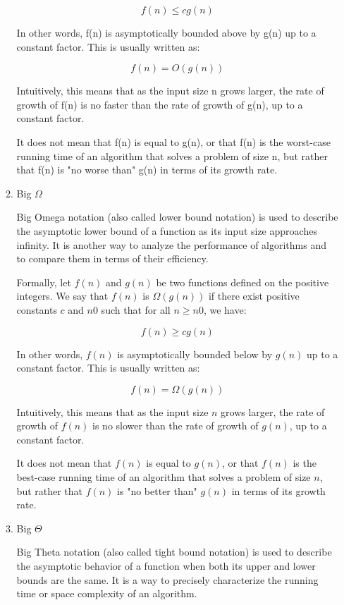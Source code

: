 \documentclass{article}
\begin{document}
\begin{enumerate}
\begin{enumerate}
    $$f(n) \leq c g(n)$$
    
    In other words, f(n) is asymptotically bounded above by g(n) up to a constant factor. This is usually written as:
    
    $$f(n) = O(g(n))$$
    
    Intuitively, this means that as the input size n grows larger, the rate of growth of f(n) is no faster than the rate of growth of g(n), up to a constant factor. 
    
    It does not mean that f(n) is equal to g(n), or that f(n) is the worst-case running time of an algorithm that solves a problem of size n, but rather that f(n) is "no worse than" g(n) in terms of its growth rate.

    \item Big $\Omega$

    Big Omega notation (also called lower bound notation) is used to describe the asymptotic lower bound of a function as its input size approaches infinity. It is another way to analyze the performance of algorithms and to compare them in terms of their efficiency.

    Formally, let $f(n)$ and $g(n)$ be two functions defined on the positive integers. We say that $f(n)$ is $\Omega(g(n))$ if there exist positive constants $c$ and $n0$ such that for all $n \geq n0$, we have:

    $$f(n) \geq c g(n)$$

    In other words, $f(n)$ is asymptotically bounded below by $g(n)$ up to a constant factor. This is usually written as:

    $$f(n) = \Omega(g(n))$$

    Intuitively, this means that as the input size $n$ grows larger, the rate of growth of $f(n)$ is no slower than the rate of growth of $g(n)$, up to a constant factor. 
    
    It does not mean that $f(n)$ is equal to $g(n)$, or that $f(n)$ is the best-case running time of an algorithm that solves a problem of size $n$, but rather that $f(n)$ is "no better than" $g(n)$ in terms of its growth rate.

    \item Big $\Theta$
    
    Big Theta notation (also called tight bound notation) is used to describe the asymptotic behavior of a function when both its upper and lower bounds are the same. It is a way to precisely characterize the running time or space complexity of an algorithm.


\end{enumerate}
\end{enumerate}
\end{document}
